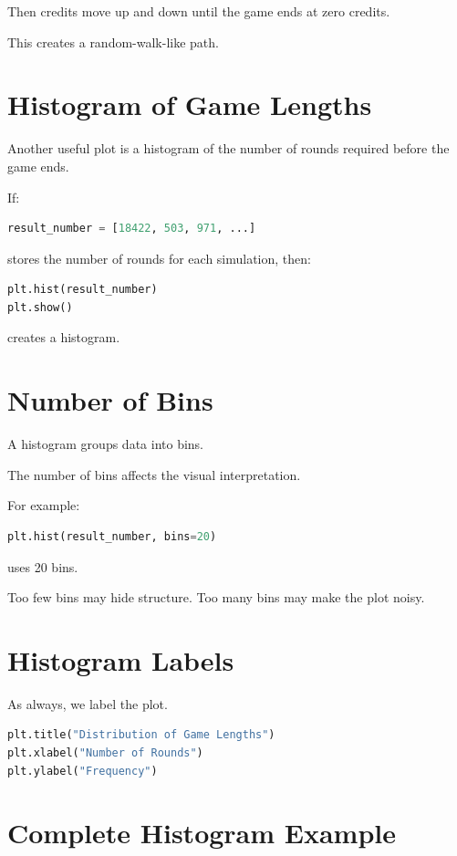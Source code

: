 \documentclass[11pt]{article}
\begin{document}
Then credits move up and down until the game ends at zero credits.

This creates a random-walk-like path.

\section{Histogram of Game Lengths}

Another useful plot is a histogram of the number of rounds required before the game ends.

If:

\begin{lstlisting}[language=Python]
result_number = [18422, 503, 971, ...]
\end{lstlisting}

stores the number of rounds for each simulation, then:

\begin{lstlisting}[language=Python]
plt.hist(result_number)
plt.show()
\end{lstlisting}

creates a histogram.

\section{Number of Bins}

A histogram groups data into bins.

The number of bins affects the visual interpretation.

For example:

\begin{lstlisting}[language=Python]
plt.hist(result_number, bins=20)
\end{lstlisting}

uses 20 bins.

Too few bins may hide structure. Too many bins may make the plot noisy.

\section{Histogram Labels}

As always, we label the plot.

\begin{lstlisting}[language=Python]
plt.title("Distribution of Game Lengths")
plt.xlabel("Number of Rounds")
plt.ylabel("Frequency")
\end{lstlisting}

\section{Complete Histogram Example}
\end{document}

